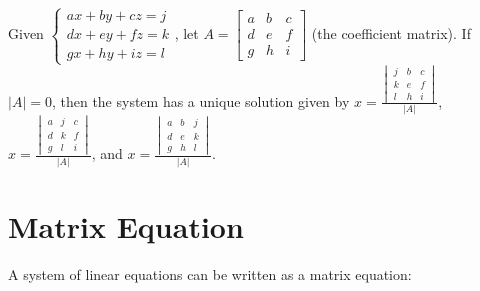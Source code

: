 \documentclass{report}
\begin{document}
Given 
$
    \begin{cases}
        ax+by+cz=j \\
        dx+ey+fz=k \\
        gx+hy+iz=l
    \end{cases}
$, let 
$
    A=
    \begin{bmatrix}
        a & b & c \\
        d & e & f \\
        g & h & i
    \end{bmatrix}
$ (the coefficient matrix). If $|A|=0$, then the system has a unique solution given by 
$
    x=\frac{
        \begin{vmatrix}
            j & b & c \\
            k & e & f \\
            l & h & i
        \end{vmatrix}
    }{|A|}
$, 
$
    x=\frac{
        \begin{vmatrix}
            a & j & c \\
            d & k & f \\
            g & l & i
        \end{vmatrix}
    }{|A|}
$, and 
$
    x=\frac{
        \begin{vmatrix}
            a & b & j \\
            d & e & k \\
            g & h & l
        \end{vmatrix}
    }{|A|}
$.

\section{Matrix Equation}

A system of linear equations can be written as a matrix equation:
\end{document}
